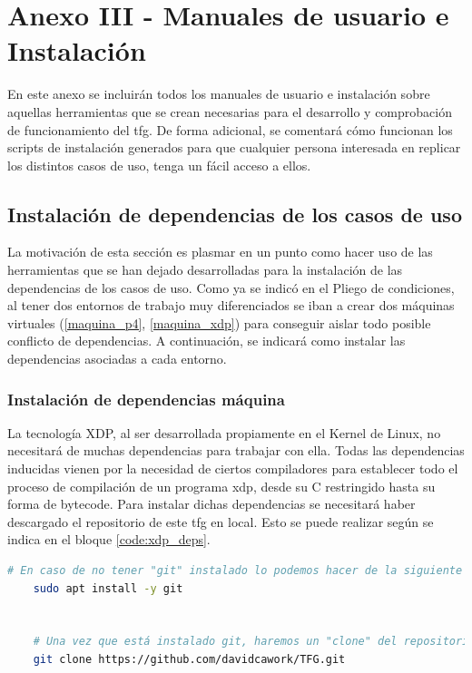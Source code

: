 \chapter{Anexo III - Manuales de usuario e Instalación}

En este anexo se incluirán todos los manuales de usuario e instalación sobre aquellas herramientas que se crean necesarias para el desarrollo y comprobación de funcionamiento del \gls{tfg}. De forma adicional, se comentará cómo funcionan los scripts de instalación generados para que cualquier persona interesada en replicar los distintos casos de uso, tenga un fácil acceso a ellos. 

\section{Instalación de dependencias de los casos de uso}
\label{deps}

La motivación de esta sección es plasmar en un punto como hacer uso de las herramientas que se han dejado desarrolladas para la instalación de las dependencias de los casos de uso. Como ya se indicó en el Pliego de condiciones, al tener dos entornos de trabajo muy diferenciados se iban a crear dos máquinas virtuales (\ref{maquina_p4}, \ref{maquina_xdp})  para conseguir aislar todo posible conflicto de dependencias. A continuación, se indicará como instalar las dependencias asociadas a cada entorno.

\subsection{Instalación de dependencias máquina }

La tecnología XDP, al ser desarrollada propiamente en el Kernel de Linux, no necesitará de muchas dependencias para trabajar con ella. Todas las dependencias inducidas vienen por la necesidad de ciertos compiladores para establecer todo el proceso de compilación de un programa \gls{xdp}, desde su C restringido hasta su forma de bytecode. Para instalar dichas dependencias se necesitará haber descargado el repositorio de este \gls{tfg} en local. Esto se puede realizar según se indica en el bloque \ref{code:xdp_deps}.

\begin{lstlisting}[language= bash, style=Consola, caption={Descarga del repositorio del TFG},label=code:xdp_deps]
    # En caso de no tener "git" instalado lo podemos hacer de la siguiente forma
    sudo apt install -y git
    
    
    # Una vez que está instalado git, haremos un "clone" del repositorio
    git clone https://github.com/davidcawork/TFG.git
\end{lstlisting}

